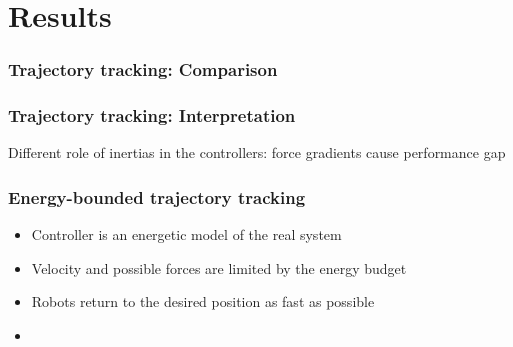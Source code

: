 \documentclass[student]{ITRslides}
\begin{document}
\section{Results}
%
\begin{frame}
	\frametitle{Trajectory tracking: Comparison}
	\vspace{-30pt}
	\begin{figure}

\end{figure}
\end{frame}


\begin{frame}
	\frametitle{Trajectory tracking: Interpretation}
\begin{figure}
	\centering
	\small
	\def\svgwidth{1\columnwidth}
	
\end{figure}
Different role of inertias in the controllers: force gradients cause performance gap
\begin{figure}
	\vspace{-30pt}
	
\end{figure}
\end{frame}

\begin{frame}
	\frametitle{Energy-bounded trajectory tracking}
	\begin{figure}
		
	\end{figure}
	\begin{itemize}
		\item Controller is an energetic model of the real system
		\item Velocity and possible forces are limited by the energy budget
		\item Robots return to the desired position as fast as possible
		\item 
	\end{itemize}
	 
	
	
\end{frame}
\end{document}
